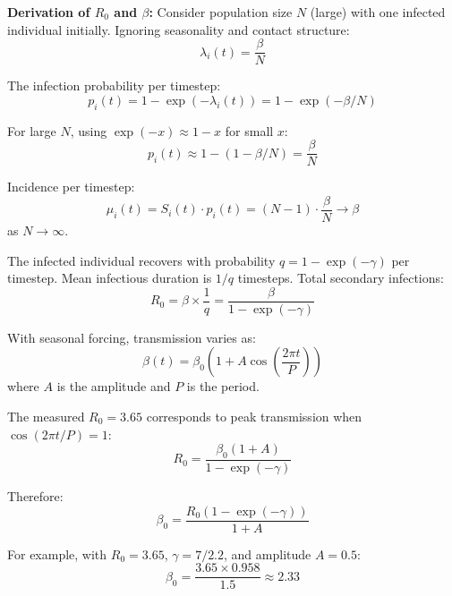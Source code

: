 \textbf{Derivation of $R_0$ and $\beta$:} Consider population size $N$ (large) with one infected individual initially. Ignoring seasonality and contact structure:
$$\lambda_i(t) = \frac{\beta}{N}$$

The infection probability per timestep:
$$p_i(t) = 1 - \exp(-\lambda_i(t)) = 1 - \exp(-\beta/N)$$

For large $N$, using $\exp(-x) \approx 1-x$ for small $x$:
$$p_i(t) \approx 1 - (1 - \beta/N) = \frac{\beta}{N}$$

Incidence per timestep:
$$\mu_i(t) = S_i(t) \cdot p_i(t) = (N-1) \cdot \frac{\beta}{N} \to \beta$$
as $N \to \infty$.

The infected individual recovers with probability $q = 1-\exp(-\gamma)$ per timestep. Mean infectious duration is $1/q$ timesteps. Total secondary infections:
$$R_0 = \beta \times \frac{1}{q} = \frac{\beta}{1-\exp(-\gamma)}$$

With seasonal forcing, transmission varies as:
$$\beta(t) = \beta_0\left(1 + A\cos\left(\frac{2\pi t}{P}\right)\right)$$
where $A$ is the amplitude and $P$ is the period.

The measured $R_0 = 3.65$ corresponds to peak transmission when $\cos(2\pi t/P) = 1$:
$$R_0 = \frac{\beta_0(1 + A)}{1-\exp(-\gamma)}$$

Therefore:
$$\beta_0 = \frac{R_0 \left(1 - \exp(-\gamma)\right)}{1 + A}$$

For example, with $R_0 = 3.65$, $\gamma = 7/2.2$, and amplitude $A = 0.5$:
$$\beta_0 = \frac{3.65 \times 0.958}{1.5} \approx 2.33$$






